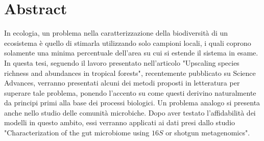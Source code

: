 \chapter{Abstract}
 

%
%


In ecologia, un problema nella caratterizzazione della biodiversità di un ecosistema è quello di stimarla utilizzando solo campioni locali, i quali coprono solamente una minima percentuale dell'area su cui si estende il sistema in esame. In questa tesi, seguendo il lavoro presentato nell'articolo "Upscaling species richness and abundances in tropical forests"\cite{Tovoe1701438}, recentemente pubblicato su Science Advances, verranno presentati alcuni dei metodi proposti in letteratura per superare tale problema, ponendo l'accento su come questi derivino naturalmente da principi primi alla base dei processi biologici. \newline
Un problema analogo si presenta anche nello studio delle comunità microbiche.
Dopo aver testato l'affidabilità dei modelli in questo ambito, essi verranno applicati ai dati presi dallo studio "Characterization of the gut microbiome using $16S$ or shotgun metagenomics"\cite{shotgun}.